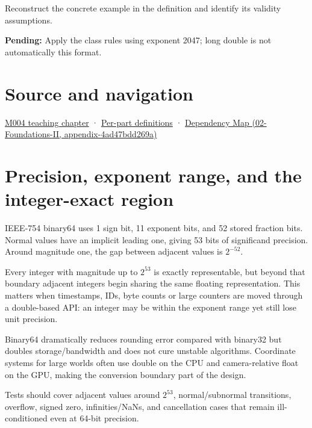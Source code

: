 Reconstruct the concrete example in the definition and identify its validity assumptions.

\textbf{Pending:} Apply the class rules using exponent 2047; long double is not automatically this format.

\section{Source and navigation}\label{appendix-5078dfab64e6-source-and-navigation}

\href{Continuous\%20Notes/Computing\%20Foundations\%20-\%20From\%20Bits\%20to\%20C++\%20and\%20Systems\%20APIs\#A\%20stretching\%20ruler\%20for\%20real-valued\%20quantities}{M004 teaching chapter} · \hyperref[appendix-fd090d982a15-m004---parts-61-76]{Per-part definitions} · \href{../02-Foundations-II/main.pdf\#nameddest=appendix-4ad47bdd269a}{Dependency Map (02-Foundations-II, appendix-4ad47bdd269a)}

\section{Precision, exponent range, and the integer-exact region}\label{appendix-5078dfab64e6-precision-exponent-range-and-the-integer-exact-region}

IEEE-754 binary64 uses 1 sign bit, 11 exponent bits, and 52 stored fraction bits. Normal values have an implicit leading one, giving 53 bits of significand precision. Around magnitude one, the gap between adjacent values is \(2^{-52}\).

Every integer with magnitude up to \(2^{53}\) is exactly representable, but beyond that boundary adjacent integers begin sharing the same floating representation. This matters when timestamps, IDs, byte counts or large counters are moved through a double-based API: an integer may be within the exponent range yet still lose unit precision.

Binary64 dramatically reduces rounding error compared with binary32 but doubles storage/bandwidth and does not cure unstable algorithms. Coordinate systems for large worlds often use double on the CPU and camera-relative float on the GPU, making the conversion boundary part of the design.

Tests should cover adjacent values around \(2^{53}\), normal/subnormal transitions, overflow, signed zero, infinities/NaNs, and cancellation cases that remain ill-conditioned even at 64-bit precision.
